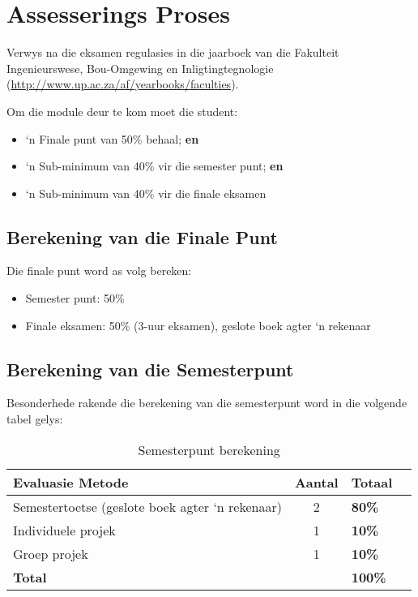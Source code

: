 \section{Assesserings Proses}
    Verwys na die eksamen regulasies in die jaarboek van die Fakulteit
    Ingenieurswese, Bou-Omgewing en Inligtingtegnologie
    (\url{http://www.up.ac.za/af/yearbooks/faculties}).

    \noindent
    Om die module deur te kom moet die student:
    \begin{itemize}
        \item `n Finale punt van 50\% behaal; {\bf en}
        \item `n Sub-minimum van 40\% vir die semester punt; {\bf en}
        \item `n Sub-minimum van 40\% vir die finale eksamen
    \end{itemize}

    \subsection{Berekening van die Finale Punt}
        Die finale punt word as volg bereken:
        \begin{itemize}
            \item Semester punt: 50\%
            \item Finale eksamen: 50\% (3-uur eksamen), geslote boek
              agter `n rekenaar
        \end{itemize}

    \subsection{Berekening van die Semesterpunt}
        Besonderhede rakende die berekening van die semesterpunt word in die
        volgende tabel gelys:
        \begin{table}[!h]
            \begin{center}
             \begin{tabular}{|p{10cm}|c|l|l|}
               \hline
               {\bf Evaluasie Metode} & {\bf Aantal} & {\bf Totaal} \\
               \hline
               Semestertoetse (geslote boek agter `n rekenaar)
               & 2 & {\bf 80\%} \\ \hline
               Individuele projek
               & 1 & {\bf 10\%} \\ \hline
               Groep projek
               & 1 & {\bf 10\%} \\
               \hline
               \multicolumn{2}{|l|}{{\bf Total}} & {\bf 100\%} \\
               \hline
             \end{tabular}
             \caption{Semesterpunt berekening}
            \end{center}
        \end{table}

